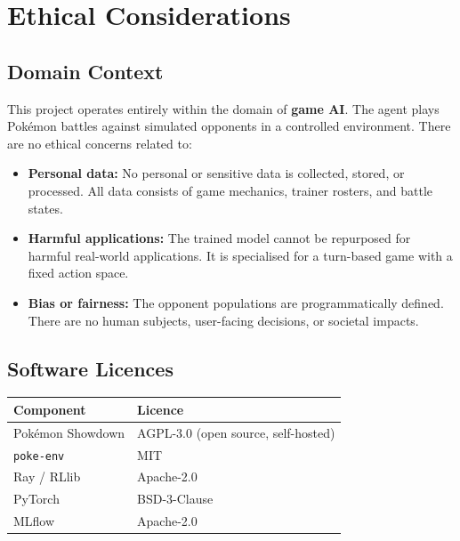 \section{Ethical Considerations}

\subsection{Domain Context}

This project operates entirely within the domain of \textbf{game AI}.  The
agent plays Pok\'{e}mon battles against simulated opponents in a controlled
environment.  There are no ethical concerns related to:

\begin{itemize}
  \item \textbf{Personal data:} No personal or sensitive data is collected,
        stored, or processed.  All data consists of game mechanics, trainer
        rosters, and battle states.
  \item \textbf{Harmful applications:} The trained model cannot be repurposed
        for harmful real-world applications.  It is specialised for a
        turn-based game with a fixed action space.
  \item \textbf{Bias or fairness:} The opponent populations are programmatically
        defined.  There are no human subjects, user-facing decisions, or
        societal impacts.
\end{itemize}

\subsection{Software Licences}

\begin{center}
\small
\begin{tabularx}{\textwidth}{l l}
  \toprule
  \textbf{Component} & \textbf{Licence} \\
  \midrule
  Pok\'{e}mon Showdown & AGPL-3.0 (open source, self-hosted) \\
  \texttt{poke-env}      & MIT \\
  Ray / RLlib           & Apache-2.0 \\
  PyTorch               & BSD-3-Clause \\
  MLflow                & Apache-2.0 \\
  \bottomrule
\end{tabularx}
\end{center}

